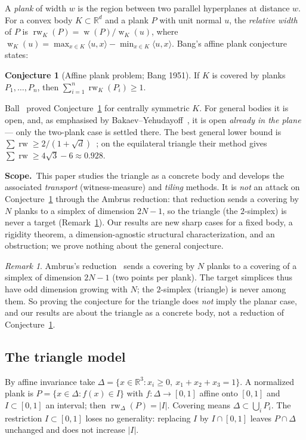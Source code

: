 \documentclass[11pt,reqno]{amsart}
\theoremstyle{plain}
\theoremstyle{definition}
\newtheorem{conjecture}[theorem]{Conjecture}
\theoremstyle{remark}
\newtheorem{remark}[theorem]{Remark}
\newcommand{\rw}{\operatorname{rw}}
\newcommand{\R}{\mathbb{R}}
\DeclareMathOperator{\wid}{w}
\begin{document}
A \emph{plank} of width $w$ is the region between two parallel hyperplanes at
distance $w$. For a convex body $K\subset\R^d$ and a plank $P$ with unit normal $u$,
the \emph{relative width} of $P$ is $\rw_K(P)=\wid(P)/\wid_K(u)$, where
$\wid_K(u)=\max_{x\in K}\langle u,x\rangle-\min_{x\in K}\langle u,x\rangle$. Bang's
affine plank conjecture~\cite{Bang51,Ambrus} states:
\begin{conjecture}[Affine plank problem; Bang 1951]\label{conj:bang}
If $K$ is covered by planks $P_1,\dots,P_n$, then $\sum_{i=1}^n \rw_K(P_i)\ge 1$.
\end{conjecture}
Ball~\cite{Ball91} proved Conjecture~\ref{conj:bang} for centrally symmetric $K$.
For general bodies it is open, and, as emphasised by Bakaev--Yehudayoff~\cite{BY26},
it is open \emph{already in the plane} --- only the two-plank case is settled there.
The best general lower bound is
$\sum\rw\ge 2/(1+\sqrt d)$~\cite{BY26}; on the equilateral triangle their method
gives $\sum\rw\ge 4\sqrt3-6\approx0.928$.

\smallskip
\noindent\textbf{Scope.}\ This paper studies the triangle as a concrete body and
develops the associated \emph{transport} (witness-measure) and \emph{tiling}
methods. It is \emph{not} an attack on Conjecture~\ref{conj:bang} through the Ambrus
reduction: that reduction sends a covering by $N$ planks to a simplex of dimension
$2N-1$, so the triangle (the $2$-simplex) is never a target
(Remark~\ref{rem:ambrus}). Our results are new sharp cases for a fixed body, a
rigidity theorem, a dimension-agnostic structural characterization, and an
obstruction; we prove nothing about the general conjecture.

\begin{remark}\label{rem:ambrus}
Ambrus's reduction~\cite{Ambrus} sends a covering by $N$ planks to a covering of a
simplex of dimension $2N-1$ (two points per plank). The target simplices thus have
odd dimension growing with $N$; the $2$-simplex (triangle) is never among them. So
proving the conjecture for the triangle does \emph{not} imply the planar case, and
our results are about the triangle as a concrete body, not a reduction of
Conjecture~\ref{conj:bang}.
\end{remark}

\subsection*{The triangle model}
By affine invariance take $\Delta=\{x\in\R^3:x_i\ge0,\ x_1+x_2+x_3=1\}$. A
normalized plank is $P=\{x\in\Delta: f(x)\in I\}$ with $f:\Delta\to[0,1]$ affine
onto $[0,1]$ and $I\subset[0,1]$ an interval; then $\rw_\Delta(P)=|I|$. Covering
means $\Delta\subset\bigcup_i P_i$. The restriction $I\subset[0,1]$ loses no
generality: replacing $I$ by $I\cap[0,1]$ leaves $P\cap\Delta$ unchanged and does
not increase $|I|$.
\end{document}
